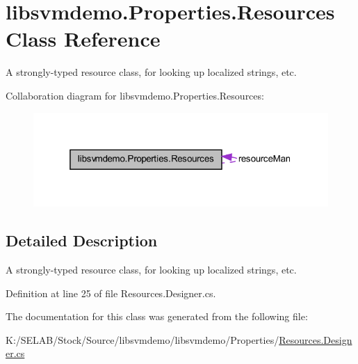 \hypertarget{classlibsvmdemo_1_1_properties_1_1_resources}{
\section{libsvmdemo.Properties.Resources Class Reference}
\label{classlibsvmdemo_1_1_properties_1_1_resources}
}


A strongly-\/typed resource class, for looking up localized strings, etc.  




Collaboration diagram for libsvmdemo.Properties.Resources:
\nopagebreak
\begin{figure}[H]
\begin{center}
\leavevmode
\includegraphics[width=319pt]{classlibsvmdemo_1_1_properties_1_1_resources__coll__graph}
\end{center}
\end{figure}


\subsection{Detailed Description}
A strongly-\/typed resource class, for looking up localized strings, etc. 

Definition at line 25 of file Resources.Designer.cs.



The documentation for this class was generated from the following file:\begin{DoxyCompactItemize}
\item 
K:/SELAB/Stock/Source/libsvmdemo/libsvmdemo/Properties/\hyperlink{_resources_8_designer_8cs}{Resources.Designer.cs}\end{DoxyCompactItemize}
